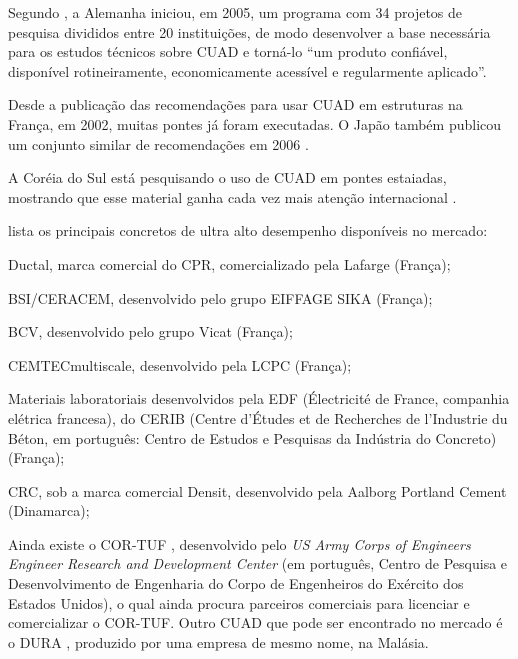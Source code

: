 Segundo , a Alemanha iniciou, em 2005, um programa com 34 projetos de pesquisa divididos entre 20 instituições, de modo desenvolver a base necessária para os estudos técnicos sobre CUAD e torná-lo ``um produto confiável, disponível rotineiramente, economicamente acessível e regularmente aplicado''.

Desde a publicação das recomendações para usar CUAD em estruturas na França, em 2002, muitas pontes já foram executadas. O Japão também publicou um conjunto similar de recomendações em 2006 \cite{Russel_e_Graybeal}.

A Coréia do Sul está pesquisando o uso de CUAD em pontes estaiadas, mostrando que esse material ganha cada vez mais atenção internacional \cite{Russel_e_Graybeal}.


 lista os principais concretos de ultra alto desempenho disponíveis no mercado:

\begin{alineas}[label=\textbullet]
  \item Ductal\textsuperscript{\textregistered}, marca comercial do CPR, comercializado pela Lafarge (França);
  \item BSI/CERACEM\textsuperscript{\textregistered}, desenvolvido pelo grupo EIFFAGE SIKA (França);
  \item BCV\textsuperscript{\textregistered}, desenvolvido pelo grupo Vicat (França);
  \item CEMTECmultiscale\textsuperscript{\textregistered}, desenvolvido pela LCPC (França);
  \item Materiais laboratoriais desenvolvidos pela EDF (Électricité de France, companhia elétrica francesa), do CERIB (Centre d’Études et de Recherches de l’Industrie du Béton, em português: Centro de Estudos e Pesquisas da Indústria do Concreto) (França);
  \item CRC, sob a marca comercial Densit\textsuperscript{\textregistered}, desenvolvido pela Aalborg Portland Cement (Dinamarca);
\end{alineas}

Ainda existe o COR-TUF\textsuperscript{\textregistered} , desenvolvido pelo \textit{US Army Corps of Engineers Engineer Research and Development Center} (em português, Centro de Pesquisa e Desenvolvimento de Engenharia do Corpo de Engenheiros do Exército dos Estados Unidos), o qual ainda procura parceiros comerciais para licenciar e comercializar o COR-TUF\textsuperscript{\textregistered}. Outro CUAD que pode ser encontrado no mercado é o DURA\textsuperscript{\textregistered} , produzido por uma empresa de mesmo nome, na Malásia.


